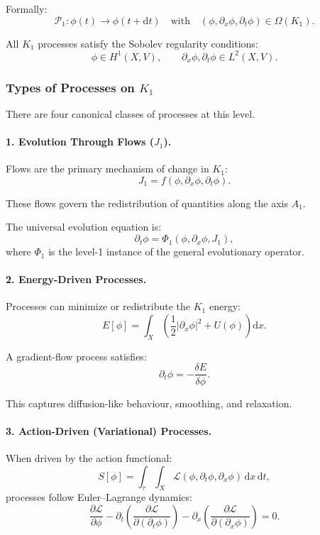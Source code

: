 Formally:
\[
\mathcal{P}_1: \phi(t) \longrightarrow \phi(t+\mathrm{d}t)
\quad \text{with} \quad
(\phi, \partial_x \phi, \partial_t \phi) \in \Omega(K_1).
\]

All $K_1$ processes satisfy the Sobolev regularity conditions:
\[
\phi \in H^1(X,V),
\qquad
\partial_x \phi, \partial_t \phi \in L^2(X,V).
\]

\subsubsection{Types of Processes on \texorpdfstring{$K_1$}{K_1}}

There are four canonical classes of processes at this level.

\paragraph{1. Evolution Through Flows (\texorpdfstring{$J_1$}{J_1}).}

Flows are the primary mechanism of change in $K_1$:
\[
J_1 = f(\phi, \partial_x\phi, \partial_t\phi).
\]

These flows govern the redistribution of quantities along the axis $A_1$.

The universal evolution equation is:
\[
\partial_t \phi = \Phi_1(\phi, \partial_x \phi, J_1),
\]
where $\Phi_1$ is the level-1 instance of the general evolutionary operator.

\paragraph{2. Energy-Driven Processes.}

Processes can minimize or redistribute the $K_1$ energy:
\[
E[\phi] = \int_X \left( 
\frac{1}{2} |\partial_x \phi|^2 + U(\phi)
\right) \mathrm{d}x.
\]

A gradient-flow process satisfies:
\[
\partial_t \phi = - \frac{\delta E}{\delta \phi}.
\]

This captures diffusion-like behaviour, smoothing, and relaxation.

\paragraph{3. Action-Driven (Variational) Processes.}

When driven by the action functional:
\[
S[\phi] = \int_{\tau} \int_X
\mathcal{L}(\phi, \partial_t\phi, \partial_x\phi) \, \mathrm{d}x \, \mathrm{d}t,
\]
processes follow Euler–Lagrange dynamics:
\[
\frac{\partial \mathcal{L}}{\partial \phi}
- \partial_t \left( \frac{\partial \mathcal{L}}{\partial(\partial_t \phi)} \right)
- \partial_x \left( \frac{\partial \mathcal{L}}{\partial(\partial_x \phi)} \right)
= 0.
\]


